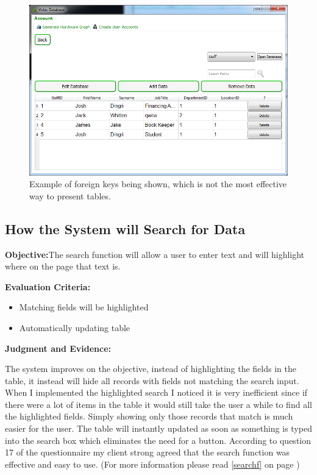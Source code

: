 \begin{figure}[H]
    \includegraphics[width=\textwidth]{./Testing/Images/RemoveDataButtons.png}
    \caption{Example of foreign keys being shown, which is not the most effective way to present tables.} 
\end{figure}

\subsection{How the System will Search for Data}

\textbf{Objective:}The search function will allow a user to enter text and will highlight where on the page that text is.

\textbf{Evaluation Criteria:}
\begin{itemize}
\item{Matching fields will be highlighted}
\item{Automatically updating table}
\end{itemize}

\textbf{Judgment and Evidence:}

The system improves on the objective, instead of highlighting the fields in the table, it instead will hide all records with fields not matching the search input. When I implemented the highlighted search I noticed it is very inefficient since if there were a lot of items in the table it would still take the user a while to find all the highlighted fields. Simply showing only those records that match is much easier for the user. The table will instantly updated as soon as something is typed into the search box which eliminates the need for a button. According to question 17 of the questionnaire my client strong agreed that the search function was effective and easy to use. (For more information please read \ref{searchf} on page \pageref{searchf})

